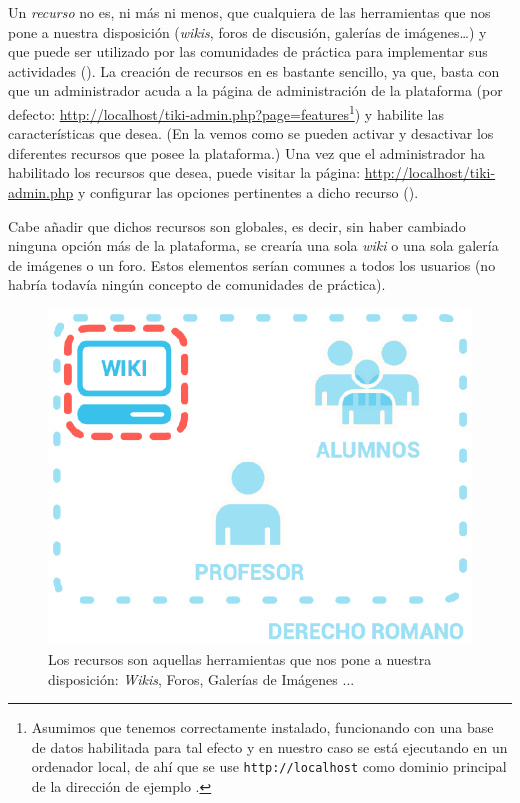Un \textit{recurso} no es, ni más ni menos, que cualquiera de las herramientas que nos pone \tiki{} a nuestra disposición (\textit{wikis}, foros de discusión, galerías de imágenes\ldots{}) y que puede ser utilizado por las comunidades de práctica para implementar sus actividades ().
La creación de recursos en \tiki{} es bastante sencillo, ya que, basta con que un administrador acuda a la página de administración de la plataforma (por defecto: \url{http://localhost/tiki-admin.php?page=features}\footnote{Asumimos que tenemos \tiki{} correctamente instalado, funcionando con una base de datos habilitada para tal efecto y en nuestro caso se está ejecutando en un ordenador local, de ahí que se use \texttt{http://localhost} como dominio principal de la dirección de ejemplo \cite{web:instalacion-tiki}.}) y habilite las características que desea. (En la  vemos como se pueden activar y desactivar los diferentes recursos que posee la plataforma.) 
 Una vez que el administrador ha habilitado los recursos que desea, puede visitar la página: \url{http://localhost/tiki-admin.php} y configurar las opciones pertinentes a dicho recurso ().


Cabe añadir que dichos recursos son globales, es decir, sin haber cambiado ninguna opción más de la plataforma, se crearía una sola \textit{wiki} o una sola galería de imágenes o un foro. Estos elementos serían comunes a todos los usuarios (no habría todavía ningún concepto de comunidades de práctica). 

\begin{figure}
\centering
\includegraphics[width=.8\linewidth]{../graphics/fig_comunidad_de_practica_derecho_romano_recursos.eps}
\caption{Los recursos son aquellas herramientas que \tiki{} nos pone a nuestra disposición: \textit{Wikis}, Foros, Galerías de Imágenes ...}\label{fig:comunidad_de_practica_derecho_romano_recursos}
\end{figure}

